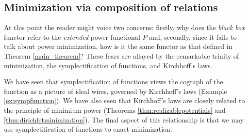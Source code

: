 \subsection{Minimization via composition of relations}

At this point the reader might voice two concerns: firstly, why does the
\emph{black box} functor refer to the \emph{extended} power functional $P$ and,
secondly, since it fails to talk about power minimization, how is it the same
functor as that defined in Theorem \ref{main_theorem}? These fears are allayed
by the remarkable trinity of minimization, the symplectification of functions,
and Kirchhoff's laws. 

We have seen that symplectification of functions views the cograph of the
function as a picture of ideal wires, governed by Kirchhoff's laws (Example
\ref{ex:sympfunction}). We have also seen that Kirchhoff's laws are closely
related to the principle of minimium power (Theorems
\ref{thm:realizablepotentials} and \ref{thm:dirichletminimization}). The final
aspect of this relationship is that we may use symplectification of functions to
enact minimization.

